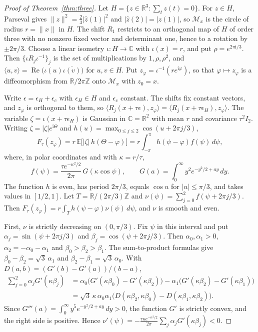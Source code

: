 \documentclass[11pt]{article}
\theoremstyle{remark}
\newcommand{\E}{\mathbb{E}}
\newcommand{\R}{\mathbb{R}}
\newcommand{\C}{\mathbb{C}}
\newcommand{\Z}{\mathbb{Z}}
\begin{document}
\begin{proof}[Proof of Theorem~\ref{thm:three}]
Let $H=\{z\in\R^3:\sum_tz(t)=0\}$. For $z\in H$, Parseval gives $\|z\|^2=\tfrac23|\widehat z(1)|^2$ and $|\widehat z(2)|=|\widehat z(1)|$, so $\mathcal M_x$ is the circle of radius $r=\|x\|$ in $H$. The shift $R_1$ restricts to an orthogonal map of $H$ of order three with no nonzero fixed vector and determinant one, hence to a rotation by $\pm2\pi/3$. Choose a linear isometry $\iota\colon H\to\C$ with $\iota(x)=r$, and put $\rho=e^{2\pi\mathrm i/3}$. Then $\{\iota R_j\iota^{-1}\}_{j}$ is the set of multiplications by $1,\rho,\rho^2$, and $\langle u,v\rangle=\operatorname{Re}\bigl(\iota(u)\overline{\iota(v)}\bigr)$ for $u,v\in H$. Put $z_\varphi=\iota^{-1}(re^{\mathrm i\varphi})$, so that $\varphi\mapsto z_\varphi$ is a diffeomorphism from $\R/2\pi\Z$ onto $\mathcal M_x$ with $z_0=x$.

Write $\epsilon=\epsilon_H+\epsilon_c$ with $\epsilon_H\in H$ and $\epsilon_c$ constant. The shifts fix constant vectors, and $z_\varphi$ is orthogonal to them, so $\langle R_j(x+\tau\epsilon),z_\varphi\rangle=\langle R_j(x+\tau\epsilon_H),z_\varphi\rangle$. The variable $\zeta=\iota(x+\tau\epsilon_H)$ is Gaussian in $\C=\R^2$ with mean $r$ and covariance $\tau^2I_2$. Writing $\zeta=|\zeta|e^{\mathrm i\Theta}$ and $h(u)=\max_{0\le j\le2}\cos(u+2\pi j/3)$,
\[
F_\tau(z_\varphi)=r\,\E\bigl[|\zeta|\,h(\Theta-\varphi)\bigr]=r\int_{-\pi}^{\pi}h(\psi-\varphi)f(\psi)\,d\psi ,
\]
where, in polar coordinates and with $\kappa=r/\tau$,
\[
f(\psi)=\frac{\tau e^{-\kappa^2/2}}{2\pi}\,G(\kappa\cos\psi),\qquad G(a)=\int_0^\infty y^2e^{-y^2/2+ay}\,dy .
\]
The function $h$ is even, has period $2\pi/3$, equals $\cos u$ for $|u|\le\pi/3$, and takes values in $[1/2,1]$. Let $T=\R/(2\pi/3)\Z$ and $\nu(\psi)=\sum_{j=0}^2f(\psi+2\pi j/3)$. Then $F_\tau(z_\varphi)=r\int_Th(\psi-\varphi)\nu(\psi)\,d\psi$, and $\nu$ is smooth and even.

First, $\nu$ is strictly decreasing on $(0,\pi/3)$. Fix $\psi$ in this interval and put $\alpha_j=\sin(\psi+2\pi j/3)$ and $\beta_j=\cos(\psi+2\pi j/3)$. Then $\alpha_0,\alpha_1>0$, $\alpha_2=-\alpha_0-\alpha_1$ and $\beta_0>\beta_2>\beta_1$. The sum-to-product formulas give $\beta_0-\beta_2=\sqrt3\,\alpha_1$ and $\beta_2-\beta_1=\sqrt3\,\alpha_0$. With $D(a,b)=(G'(b)-G'(a))/(b-a)$,
\begin{align*}
\sum_{j=0}^2\alpha_jG'(\kappa \beta_j)&=\alpha_0\bigl(G'(\kappa \beta_0)-G'(\kappa \beta_2)\bigr)-\alpha_1\bigl(G'(\kappa \beta_2)-G'(\kappa \beta_1)\bigr)\\
&=\sqrt3\,\kappa\,\alpha_0\alpha_1\bigl(D(\kappa \beta_2,\kappa \beta_0)-D(\kappa \beta_1,\kappa \beta_2)\bigr).
\end{align*}
Since $G'''(a)=\int_0^\infty y^5e^{-y^2/2+ay}\,dy>0$, the function $G'$ is strictly convex, and the right side is positive. Hence $\nu'(\psi)=-\tfrac{\tau\kappa e^{-\kappa^2/2}}{2\pi}\sum_j\alpha_jG'(\kappa \beta_j)<0$.


\end{proof}
\end{document}

